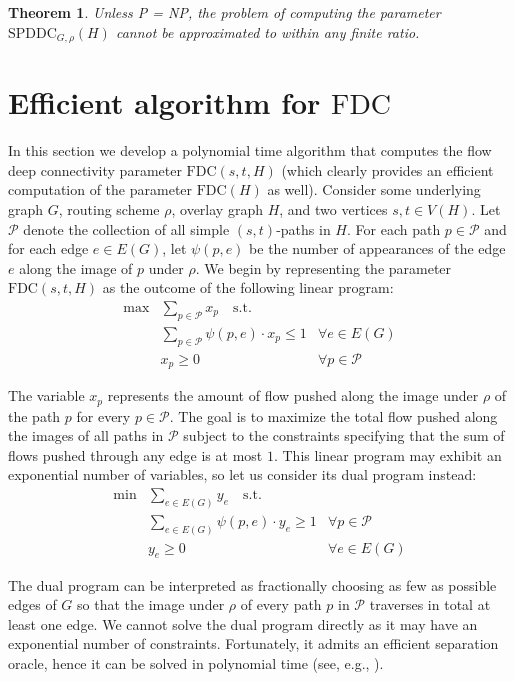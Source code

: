 \LongVersion \documentclass[11pt]{article}
\newtheorem{theorem}{Theorem}[section]
\theoremstyle{definition}
\theoremstyle{plain}
\newcommand{\Vertices}[0]{\mathit{V}}
\newcommand{\Edges}[0]{\mathit{E}}
\newcommand{\SPDDC}[0]{\mathrm{SPDDC}}
\newcommand{\FDC}[0]{\mathrm{FDC}}
\begin{document}
\begin{theorem} \label{theorem:HardnessAllPairsSPDDC}
Unless P = NP, the problem of computing the parameter $\SPDDC_{G, \rho}(H)$
cannot be approximated to within any finite ratio.
\end{theorem}

\section{Efficient algorithm for $\FDC$}
\label{section:EfficientAlgorithmFDC}


In this section we develop a polynomial time algorithm that computes the
flow deep connectivity parameter $\FDC(s, t, H)$ (which clearly provides
an efficient computation of the parameter $\FDC(H)$ as well).
Consider some underlying graph $G$, routing scheme $\rho$, overlay graph $H$,
and two vertices $s, t \in \Vertices(H)$.
Let $\mathcal{P}$ denote the collection of all simple $(s, t)$-paths in $H$.
For each path $p \in \mathcal{P}$ and for each edge $e \in \Edges(G)$, let
$\psi(p, e)$ be the number of appearances of the edge $e$ along the image of
$p$ under $\rho$.
We begin by representing the parameter $\FDC(s, t, H)$ as the outcome of the
following linear program:
$$
\begin{array}{llr}
\max & \sum_{p \in \mathcal{P}} x_{p} \quad \text{s.t.} & \\
& \sum_{p \in \mathcal{P}} \psi(p, e) \cdot x_{p} \leq 1 & \forall e \in
\Edges(G) \\
& x_{p} \geq 0 & \forall p \in \mathcal{P}
\end{array}
$$

The variable $x_{p}$ represents the amount of flow pushed along the image
under $\rho$ of the path $p$ for every $p \in \mathcal{P}$.
The goal is to maximize the total flow pushed along the images of all paths in
$\mathcal{P}$ subject to the constraints specifying that the sum of flows
pushed through any edge is at most $1$.
This linear program may exhibit an exponential number of variables, so let us
consider its dual program instead:
$$
\begin{array}{llr}
\min & \sum_{e \in \Edges(G)} y_{e} \quad \text{s.t.} & \\
& \sum_{e \in \Edges(G)} \psi(p, e) \cdot y_{e} \geq 1 & \forall p \in
\mathcal{P} \\
& y_{e} \geq 0 & \forall e \in \Edges(G)
\end{array}
$$

The dual program can be interpreted as fractionally choosing as few as
possible edges of $G$ so that the image under $\rho$ of every path $p$ in
$\mathcal{P}$ traverses in total at least one edge.
We cannot solve the dual program directly as it may have an exponential
number of constraints.
Fortunately, it admits an efficient separation oracle, hence it can be solved
in polynomial time (see, e.g., \cite{GLS93}).
\end{document}
